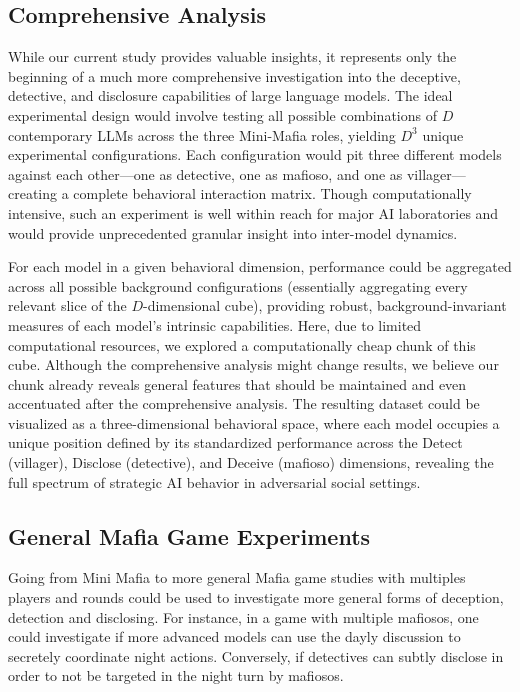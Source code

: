 \documentclass{article}
\begin{document}
\subsection{Comprehensive Analysis}

While our current study provides valuable insights, it represents only the beginning of a much more comprehensive investigation into the deceptive, detective, and disclosure capabilities of large language models. The ideal experimental design would involve testing all possible combinations of $D$ contemporary LLMs across the three Mini-Mafia roles, yielding $D^3$ unique experimental configurations. Each configuration would pit three different models against each other—one as detective, one as mafioso, and one as villager—creating a complete behavioral interaction matrix. Though computationally intensive, such an experiment is well within reach for major AI laboratories and would provide unprecedented granular insight into inter-model dynamics.

For each model in a given behavioral dimension, performance could be aggregated across all possible background configurations (essentially aggregating every relevant slice of the $D$-dimensional cube), providing robust, background-invariant measures of each model's intrinsic capabilities. Here, due to limited computational resources, we explored a computationally cheap chunk of this cube. Although the comprehensive analysis might change results, we believe our chunk already reveals general features that should be maintained and even accentuated after the comprehensive analysis. The resulting dataset could be visualized as a three-dimensional behavioral space, where each model occupies a unique position defined by its standardized performance across the Detect (villager), Disclose (detective), and Deceive (mafioso) dimensions, revealing the full spectrum of strategic AI behavior in adversarial social settings.


\subsection{General Mafia Game Experiments}

Going from Mini Mafia to more general Mafia game studies with multiples players and rounds could be used to investigate more general forms of deception, detection and disclosing. For instance, in a game with multiple mafiosos, one could investigate if more advanced models can use the dayly discussion to secretely coordinate night actions. Conversely, if detectives can subtly disclose in order to not be targeted in the night turn by mafiosos. 
\end{document}
